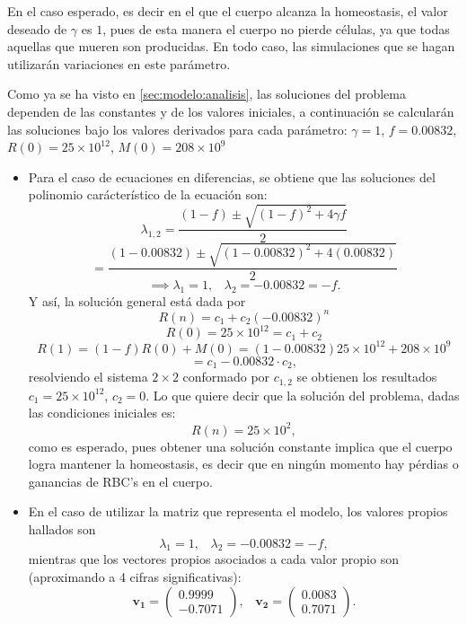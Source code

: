 En el caso esperado, es decir en el que el cuerpo alcanza la homeostasis, el valor deseado de $\gamma$ es $1$, pues de esta manera el cuerpo no pierde células, ya que todas aquellas que mueren son producidas. En todo caso, las simulaciones que se hagan utilizarán variaciones en este parámetro.

Como ya se ha visto en \ref{sec:modelo:analisis}, las soluciones del problema dependen de las constantes y de los valores iniciales, a continuación se calcularán las soluciones bajo los valores derivados para cada parámetro: $\gamma = 1$, $f = 0.00832$, $R(0)=25\times 10^{12}$, $M(0)=208\times 10^{9}$ 

\begin{itemize}
    \item Para el caso de ecuaciones en diferencias, se obtiene que las soluciones del polinomio carácterístico de la ecuación son:
        $$\lambda_{1,2}=\dfrac{(1-f)\pm\sqrt{(1-f)^2+4\gamma f}}{2}$$
        $$=\dfrac{(1-0.00832)\pm \sqrt{(1-0.00832)^2+4(0.00832)}}{2}$$
        $$\implies \lambda_1 = 1,\;\;\; \lambda_2 = -0.00832=-f.$$
        Y así, la solución general está dada por 
        $$R(n)=c_1+c_2(-0.00832)^n$$
        $$R(0)=25\times 10^{12}=c_1+c_2$$
        $$R(1)=(1-f)R(0)+M(0)=(1-0.00832)25 \times 10^{12}+208\times 10^9$$
        $$=c_1-0.00832\cdot c_2,$$
        resolviendo el sistema $2\times 2$ conformado por $c_{1,2}$ se obtienen los resultados $c_1=25\times 10^{12}$, $c_2 = 0$. Lo que quiere decir que la solución del problema, dadas las condiciones iniciales es:
        $$R(n)=25\times 10^{2},$$
        como es esperado, pues obtener una solución constante implica que el cuerpo logra mantener la homeostasis, es decir que en ningún momento hay pérdias o ganancias de RBC's en el cuerpo.
    \item En el caso de utilizar la matriz que representa el modelo, los valores propios hallados son
        $$\lambda_1 = 1, \;\;\; \lambda_2 = -0.00832=-f,$$
        mientras que los vectores propios asociados a cada valor propio son (aproximando a 4 cifras significativas):
        $$\mathbf{v_1}=\begin{pmatrix}
            0.9999  \\
            -0.7071
            \end{pmatrix},\;\;\;  \mathbf{v_2}=\begin{pmatrix}
            0.0083 \\
            0.7071
            \end{pmatrix}.$$

\end{itemize}

